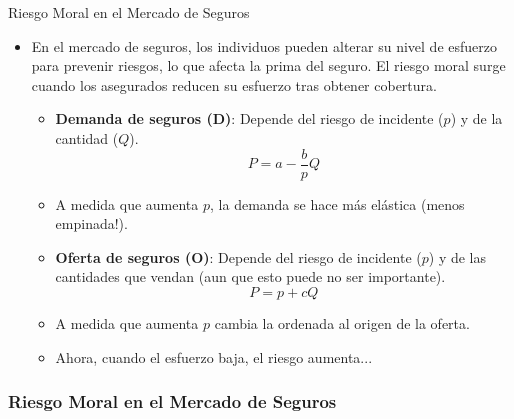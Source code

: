 \documentclass{beamer}
\begin{document}
\begin{frame}{Riesgo Moral en el Mercado de Seguros}
    \begin{itemize}
        \item En el mercado de seguros, los individuos pueden alterar su nivel de esfuerzo para prevenir riesgos, lo que afecta la prima del seguro. El riesgo moral surge cuando los asegurados reducen su esfuerzo tras obtener cobertura.
        \begin{itemize}
            \item \textbf{Demanda de seguros (D)}: Depende del riesgo de incidente ($p$) y de la cantidad ($Q$).
            \[P = a - \frac{b}{p} Q \]
            \item A medida que aumenta $p$, la demanda se hace más elástica (menos empinada!).
            \item \textbf{Oferta de seguros (O)}: Depende del riesgo de incidente ($p$) y de las cantidades que vendan (aun que esto puede no ser importante).
            \[P = p + c Q \]
            \item A medida que aumenta $p$ cambia la ordenada al origen de la oferta.
            \item Ahora, cuando el esfuerzo baja, el riesgo aumenta...
        \end{itemize}
    \end{itemize}
\end{frame}
    
\begin{frame}
    \frametitle{Riesgo Moral en el Mercado de Seguros}
    \begin{center}
    \end{center}
\end{frame}
\end{document}
